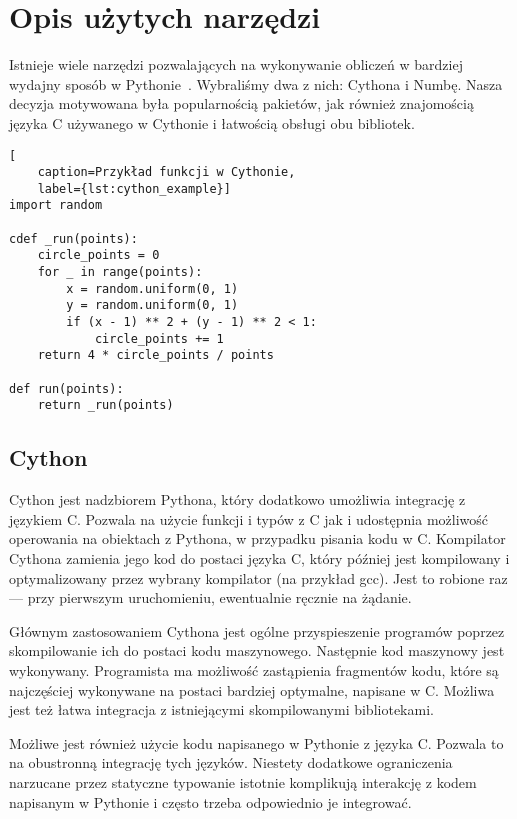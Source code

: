 \section{Opis użytych narzędzi}

Istnieje wiele narzędzi pozwalających na wykonywanie obliczeń w bardziej
wydajny sposób w Pythonie~\cite{python_marowka}.
Wybraliśmy dwa z nich: Cythona i Numbę.
Nasza decyzja motywowana była popularnością pakietów,
jak również znajomością języka C używanego w Cythonie
i łatwością obsługi obu bibliotek.

\begin{lstlisting}[
    caption=Przykład funkcji w Cythonie,
    label={lst:cython_example}]
import random

cdef _run(points):
    circle_points = 0
    for _ in range(points):
        x = random.uniform(0, 1)
        y = random.uniform(0, 1)
        if (x - 1) ** 2 + (y - 1) ** 2 < 1:
            circle_points += 1
    return 4 * circle_points / points

def run(points):
    return _run(points)
\end{lstlisting}

\subsection{Cython}

Cython jest nadzbiorem Pythona, który dodatkowo umożliwia integrację
z językiem C\@.
Pozwala na użycie funkcji i typów z C jak i udostępnia
możliwość operowania na obiektach z Pythona, w przypadku
pisania kodu w C\@.
Kompilator Cythona zamienia jego kod do postaci języka C,
który później jest kompilowany i optymalizowany
przez wybrany kompilator (na przykład gcc).
Jest to robione raz --- przy pierwszym uruchomieniu,
ewentualnie ręcznie na żądanie.

Głównym zastosowaniem Cythona jest ogólne przyspieszenie programów
poprzez skompilowanie ich do postaci kodu maszynowego.
Następnie kod maszynowy jest wykonywany.
Programista ma możliwość zastąpienia fragmentów kodu, które
są najczęściej wykonywane na postaci bardziej optymalne,
napisane w C\@.
Możliwa jest też łatwa integracja z istniejącymi skompilowanymi
bibliotekami.

Możliwe jest również użycie kodu napisanego w Pythonie z języka C\@.
Pozwala to na obustronną integrację tych języków.
Niestety dodatkowe ograniczenia narzucane przez statyczne typowanie
istotnie komplikują interakcję z kodem napisanym w Pythonie
i często trzeba odpowiednio je integrować.

